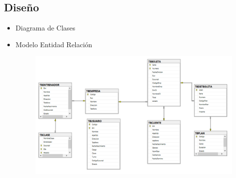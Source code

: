 \subsection{Diseño}
\begin{itemize}
	\item Diagrama de Clases

	\item Modelo Entidad Relación
\begin{figure}[H]
		\begin{center}
			\includegraphics[width=15cm]{./Imagenes/MEntidadRelacion}
		\end{center}
	\end{figure}
\end{itemize}




